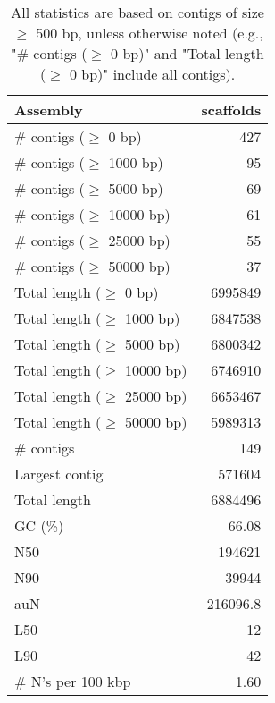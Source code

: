 \documentclass[12pt,a4paper]{article}
\begin{document}
\begin{table}[ht]
\begin{center}
\caption{All statistics are based on contigs of size $\geq$ 500 bp, unless otherwise noted (e.g., "\# contigs ($\geq$ 0 bp)" and "Total length ($\geq$ 0 bp)" include all contigs).}
\begin{tabular}{|l*{1}{|r}|}
\hline
Assembly & scaffolds \\ \hline
\# contigs ($\geq$ 0 bp) & 427 \\ \hline
\# contigs ($\geq$ 1000 bp) & 95 \\ \hline
\# contigs ($\geq$ 5000 bp) & 69 \\ \hline
\# contigs ($\geq$ 10000 bp) & 61 \\ \hline
\# contigs ($\geq$ 25000 bp) & 55 \\ \hline
\# contigs ($\geq$ 50000 bp) & 37 \\ \hline
Total length ($\geq$ 0 bp) & 6995849 \\ \hline
Total length ($\geq$ 1000 bp) & 6847538 \\ \hline
Total length ($\geq$ 5000 bp) & 6800342 \\ \hline
Total length ($\geq$ 10000 bp) & 6746910 \\ \hline
Total length ($\geq$ 25000 bp) & 6653467 \\ \hline
Total length ($\geq$ 50000 bp) & 5989313 \\ \hline
\# contigs & 149 \\ \hline
Largest contig & 571604 \\ \hline
Total length & 6884496 \\ \hline
GC (\%) & 66.08 \\ \hline
N50 & 194621 \\ \hline
N90 & 39944 \\ \hline
auN & 216096.8 \\ \hline
L50 & 12 \\ \hline
L90 & 42 \\ \hline
\# N's per 100 kbp & 1.60 \\ \hline
\end{tabular}
\end{center}
\end{table}
\end{document}
